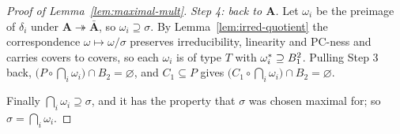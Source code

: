 \begin{proof}[Proof of Lemma~\ref{lem:maximal-mult}]
\emph{Step 4: back to $\mathbf A$.} Let $\omega_{i}$ be the preimage of
$\delta_{i}$ under $\mathbf A\twoheadrightarrow\bar{\mathbf A}$, so
$\omega_{i}\supseteq\sigma$. By Lemma~\ref{lem:irred-quotient} the
correspondence $\omega\mapsto\omega/\sigma$ preserves irreducibility,
linearity and PC-ness and carries covers to covers, so each $\omega_{i}$ is of
type $T$ with $\omega_{i}^{*}\supseteq B_{1}^{2}$. Pulling Step 3 back,
$\bigl(P\circ\bigcap_{i}\omega_{i}\bigr)\cap B_{2}=\varnothing$, and
$C_{1}\subseteq P$ gives
$\bigl(C_{1}\circ\bigcap_{i}\omega_{i}\bigr)\cap B_{2}=\varnothing$.

Finally $\bigcap_{i}\omega_{i}\supseteq\sigma$, and it has the property that
$\sigma$ was chosen maximal for; so $\sigma=\bigcap_{i}\omega_{i}$.
\end{proof}

